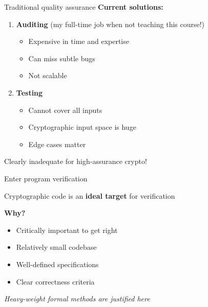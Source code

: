 \documentclass[aspectratio=169, lualatex, handout]{beamer}
\begin{document}
\begin{frame}{Traditional quality assurance}
	\textbf{Current solutions:}
	\vspace{0.5em}
	\begin{enumerate}
		\item \textbf{Auditing} (my full-time job when not teaching this course!)
		      \begin{itemize}
			      \item Expensive in time and expertise
			      \item Can miss subtle bugs
			      \item Not scalable
		      \end{itemize}
		      \vspace{0.5em}
		\item \textbf{Testing}
		      \begin{itemize}
			      \item Cannot cover all inputs
			      \item Cryptographic input space is huge
			      \item Edge cases matter
		      \end{itemize}
	\end{enumerate}
	\vspace{1em}
	\begin{center}
		\Large
		Clearly inadequate for high-assurance crypto!
	\end{center}
\end{frame}

\begin{frame}{Enter program verification}
	\begin{center}
		\Large
		Cryptographic code is an \textbf{ideal target} for verification
	\end{center}
	\vspace{1em}
	\textbf{Why?}
	\begin{itemize}
		\item Critically important to get right
		\item Relatively small codebase
		\item Well-defined specifications
		\item Clear correctness criteria
	\end{itemize}
	\vspace{0.5em}
	\begin{center}
		\textit{Heavy-weight formal methods are justified here}
	\end{center}
\end{frame}
\end{document}
